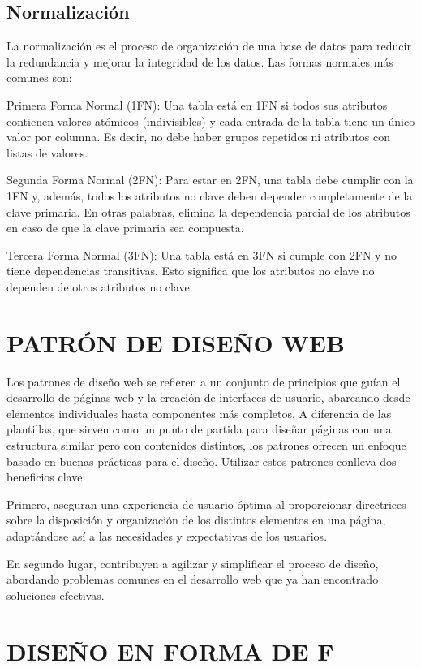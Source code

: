 	\subsection{Normalización}
		La normalización es el proceso de organización de una base de datos para reducir la redundancia y mejorar la integridad de los datos. Las formas normales más comunes son:
		
		Primera Forma Normal (1FN): Una tabla está en 1FN si todos sus atributos contienen valores atómicos (indivisibles) y cada entrada de la tabla tiene un único valor por columna. Es decir, no debe haber grupos repetidos ni atributos con listas de valores.
		
		Segunda Forma Normal (2FN): Para estar en 2FN, una tabla debe cumplir con la 1FN y, además, todos los atributos no clave deben depender completamente de la clave primaria. En otras palabras, elimina la dependencia parcial de los atributos en caso de que la clave primaria sea compuesta.
		
		Tercera Forma Normal (3FN): Una tabla está en 3FN si cumple con 2FN y no tiene dependencias transitivas. Esto significa que los atributos no clave no dependen de otros atributos no clave.
		
	\section{PATRÓN DE DISEÑO WEB}
		Los patrones de diseño web se refieren a un conjunto de principios que guían el desarrollo de páginas web y la creación de interfaces de usuario, abarcando desde elementos individuales hasta componentes más completos. A diferencia de las plantillas, que sirven como un punto de partida para diseñar páginas con una estructura similar pero con contenidos distintos, los patrones ofrecen un enfoque basado en buenas prácticas para el diseño. Utilizar estos patrones conlleva dos beneficios clave:
		
		Primero, aseguran una experiencia de usuario óptima al proporcionar directrices sobre la disposición y organización de los distintos elementos en una página, adaptándose así a las necesidades y expectativas de los usuarios.
		
		En segundo lugar, contribuyen a agilizar y simplificar el proceso de diseño, abordando problemas comunes en el desarrollo web que ya han encontrado soluciones efectivas.
		
	\section{DISEÑO EN FORMA DE F}
		
